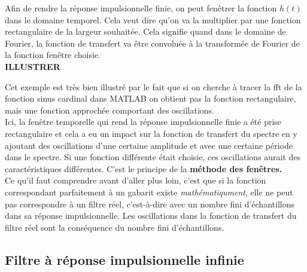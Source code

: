 \documentclass[11pt,a4paper]{article}
\begin{document}
Afin de rendre la réponse impulsionnelle finie, on peut fenêtrer la fonction $h(t)$ dans le domaine temporel. Cela veut dire qu'on va la multiplier par une fonction rectangulaire de la largeur souhaitée. Cela signifie quand dans le domaine de Fourier, la fonction de transfert va être convoluée à la transformée de Fourier de la fonction fenêtre choisie.\\

\textbf{ILLUSTRER}

Cet exemple est très bien illustré par le fait que si on cherche à tracer la fft de la fonction sinus cardinal dans MATLAB on obtient pas la fonction rectangulaire, mais une fonction approchée comportant des oscillations.\\

Ici, la fenêtre temporelle qui rend la réponse impulsionnelle finie a été prise rectangulaire et cela a eu un impact sur la fonction de transfert du spectre en y ajoutant des oscillations d'une certaine amplitude et avec une certaine période dans le spectre. Si une fonction différente était choisie, ces oscillations aurait des caractéristiques différentes. C'est le principe de la \textbf{méthode des fenêtres.}\\

Ce qu'il faut comprendre avant d'aller plus loin, c'est que si la fonction correspondant parfaitement à un gabarit existe \textit{mathématiqument}, elle ne peut pas correspondre à un filtre réel, c'est-à-dire avec un nombre fini d'échantillons dans sa réponse impulsionnelle. Les oscillations dans la fonction de transfert du filtre réel sont la conséquence du nombre fini d'échantillons.

\subsection{Filtre à réponse impulsionnelle infinie}
\end{document}
